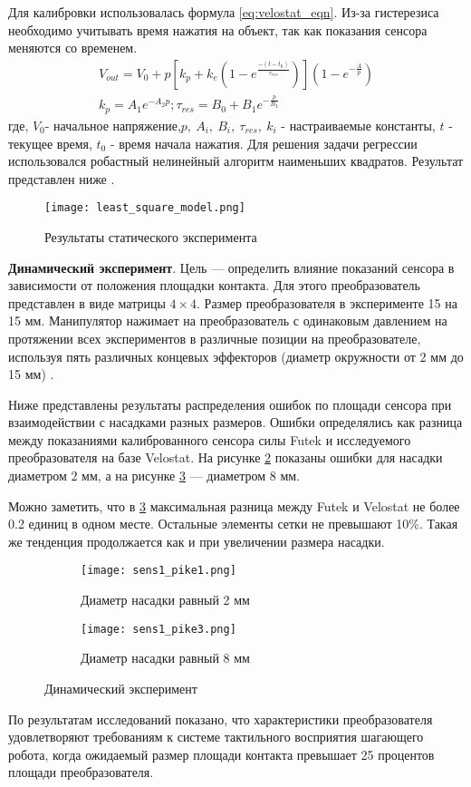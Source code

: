 Для калибровки использовалась формула \eqref{eq:velostat_eqn}. Из-за гистерезиса необходимо учитывать время нажатия на объект, так как показания сенсора меняются со временем.
\begin{align}
    \label{eq:velostat_eqn}
    V_{out} = V_0 + p[k_p + k_e(1-e^\frac{-(t-t_0)}{\tau_{res}})](1-e^{-\frac{A}{p}}) \\
    k_p = A_1e^{-A_2p}; \tau_{res} = B_0 + B_1e^{-\frac{p}{B_2}}
\end{align}
где,  $V_0$- начальное напряжение,$p,\ A_i,\ B_i,\ \tau_{res},\ k_i$  - настраиваемые константы, $t$ - текущее время, $t_0$ - время начала нажатия.
Для решения задачи регрессии использовался робастный нелинейный алгоритм наименьших квадратов. Результат представлен ниже .

\begin{figure}[H]
    \centering\texttt{[image: least\_square\_model.png]}
    \caption{Результаты статического эксперимента}
    \label{fig:least_square_model.png}
\end{figure}

\textbf{Динамический эксперимент}. Цель --- определить влияние показаний сенсора в зависимости от положения площадки контакта. Для этого преобразователь представлен в виде матрицы $4 \times 4$. Размер преобразователя в эксперименте 15 на 15 мм. Манипулятор нажимает на преобразователь с одинаковым давлением на протяжении всех экспериментов в различные позиции на преобразователе, используя пять различных концевых эффекторов (диаметр окружности от 2 мм до 15 мм) .



Ниже  представлены результаты распределения ошибок по площади сенсора при взаимодействии с насадками разных размеров. Ошибки определялись как разница между показаниями калиброванного сенсора силы Futek и исследуемого преобразователя на базе Velostat. На рисунке \ref{fig:sens1_pike1} показаны ошибки для насадки диаметром 2 мм, а на рисунке \ref{fig:sens1_pike3} --- диаметром 8 мм.

Можно заметить, что в \ref{fig:sens1_pike3} максимальная разница между Futek и Velostat не более 0.2 единиц в одном месте. Остальные элементы сетки не превышают 10\%. Такая же тенденция продолжается как и при увеличении размера насадки.

\begin{figure}[H]
    \begin{subfigure}{0.49\textwidth}
        \centering\texttt{[image: sens1\_pike1.png]}
        \caption{Диаметр насадки равный 2 мм }
        \label{fig:sens1_pike1}
    \end{subfigure}
    \begin{subfigure}{0.49\textwidth}
        \centering\texttt{[image: sens1\_pike3.png]}
        \caption{Диаметр насадки равный 8 мм }
        \label{fig:sens1_pike3}
    \end{subfigure}
    \caption{Динамический эксперимент}
    \label{fig:dynamics_exp}
\end{figure}

По результатам исследований показано, что характеристики преобразователя удовлетворяют требованиям к системе тактильного восприятия шагающего робота, когда ожидаемый размер площади контакта превышает 25 процентов площади преобразователя.